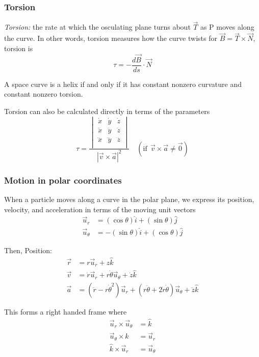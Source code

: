 \documentclass[12pt]{article}
\begin{document}
\subsubsection{Torsion}
\emph{Torsion:} the rate at which the osculating plane turns about $\vec{T}$ as P moves along the curve. In other words, torsion measures how the curve twists
for $\vec{B} = \vec{T} \times \vec{N}$, torsion is 
\[\tau = -\frac{d\vec{B}}{ds} \cdot \vec{N}\]

A space curve is a helix if and only if it has constant nonzero curvature and constant nonzero torsion.

Torsion can also be calculated directly in terms of the parameters
\[\tau = \frac{\begin{vmatrix}
    \dot{x} & \dot{y} & \dot{z}\\
    \ddot{x} & \ddot{y} & \ddot{z}\\
    \dddot{x} & \dddot{y} & \dddot{z}\\
\end{vmatrix}}{|\vec{v} \times \vec{a}|^2} \quad (\text{if}\;\,\vec{v} \times \vec{a} \neq \vec{0})\]

\subsubsection{Motion in polar coordinates}
When a particle moves along a curve in the polar plane, we express its position, velocity, and acceleration in terms of the moving unit vectors
\begin{align*}
    \vec{u}_r &= (\cos \theta) \hat{i} + (\sin \theta) \hat{j}\\
    \vec{u}_\theta &= -(\sin \theta)\hat{i} + (\cos \theta) \hat{j}
\end{align*}

Then,
Position:
\begin{align*}
    \vec{r} &= r \vec{u}_r + z \hat{k}\\
    \vec{v} &= \dot{r} \vec{u}_r + r \dot{\theta} \vec{u}_\theta + \dot{z} \hat{k}\\
    \vec{a} &= (\ddot{r} - r \dot{\theta}^2) \vec{u}_r + (r\ddot{\theta} + 2\dot{r} \dot{\theta}) \vec{u}_\theta + \ddot{z} \hat{k}
\end{align*}

This forms a right handed frame where
\begin{align*}
    \vec{u}_r \times \vec{u}_\theta &= \hat{k}\\
    \vec{u}_\theta \times \hat{k} &= \vec{u}_r\\
    \hat{k} \times \vec{u}_r &= \vec{u}_\theta
\end{align*}
\end{document}

